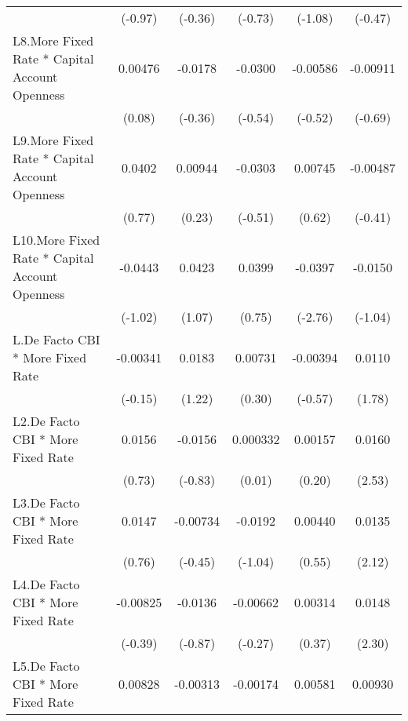 {\begin{longtable}{l*{5}{c}}
                &  (-0.97)         &  (-0.36)         &  (-0.73)         &  (-1.08)         &  (-0.47)         \\
[1em]
L8.More Fixed Rate * Capital Account Openness&  0.00476         &  -0.0178         &  -0.0300         & -0.00586         & -0.00911         \\
                &   (0.08)         &  (-0.36)         &  (-0.54)         &  (-0.52)         &  (-0.69)         \\
[1em]
L9.More Fixed Rate * Capital Account Openness&   0.0402         &  0.00944         &  -0.0303         &  0.00745         & -0.00487         \\
                &   (0.77)         &   (0.23)         &  (-0.51)         &   (0.62)         &  (-0.41)         \\
[1em]
L10.More Fixed Rate * Capital Account Openness&  -0.0443         &   0.0423         &   0.0399         &  -0.0397\sym{**} &  -0.0150         \\
                &  (-1.02)         &   (1.07)         &   (0.75)         &  (-2.76)         &  (-1.04)         \\
[1em]
L.De Facto CBI * More Fixed Rate& -0.00341         &   0.0183         &  0.00731         & -0.00394         &   0.0110         \\
                &  (-0.15)         &   (1.22)         &   (0.30)         &  (-0.57)         &   (1.78)         \\
[1em]
L2.De Facto CBI * More Fixed Rate&   0.0156         &  -0.0156         & 0.000332         &  0.00157         &   0.0160\sym{*}  \\
                &   (0.73)         &  (-0.83)         &   (0.01)         &   (0.20)         &   (2.53)         \\
[1em]
L3.De Facto CBI * More Fixed Rate&   0.0147         & -0.00734         &  -0.0192         &  0.00440         &   0.0135\sym{*}  \\
                &   (0.76)         &  (-0.45)         &  (-1.04)         &   (0.55)         &   (2.12)         \\
[1em]
L4.De Facto CBI * More Fixed Rate& -0.00825         &  -0.0136         & -0.00662         &  0.00314         &   0.0148\sym{*}  \\
                &  (-0.39)         &  (-0.87)         &  (-0.27)         &   (0.37)         &   (2.30)         \\
[1em]
L5.De Facto CBI * More Fixed Rate&  0.00828         & -0.00313         & -0.00174         &  0.00581         &  0.00930         \\

\end{longtable}}
